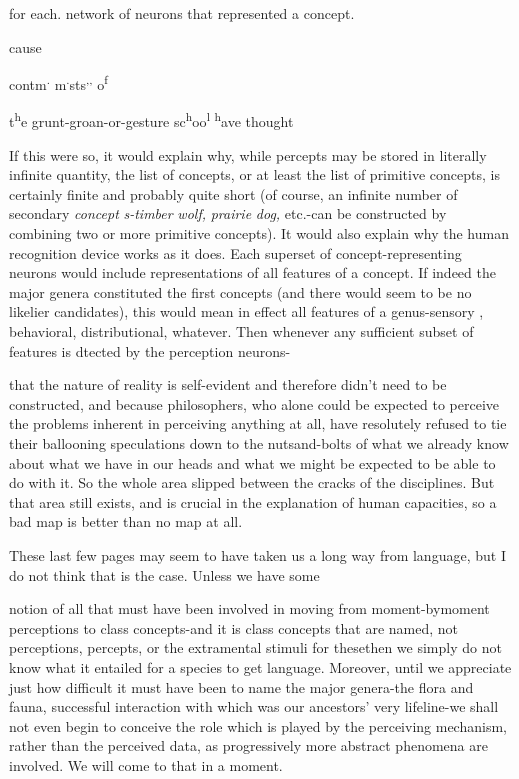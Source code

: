 for each. network of neurons that represented a concept.

cause

\textsuperscript{{\textquotedbl}}contm\textsuperscript{.} m\textsuperscript{.}sts\textsuperscript{,,} o\textsuperscript{f}

t\textsuperscript{h}e grunt-groan-or-gesture sc\textsuperscript{h}oo\textsuperscript{l} \textsuperscript{h}ave thought

If this were so, it would explain why, while percepts may be stored in literally infinite quantity, the list of concepts, or at least the list of primitive concepts, is certainly finite and probably quite short (of course, an infinite number of secondary \textit{concept} \textit{s-timber} \textit{wolf,} \textit{prairie} \textit{dog,} etc.-can be constructed by combining two or more primitive concepts). It would also explain why the human recognition device works as it does. Each superset of concept-representing neurons would include representations of all features of a concept. If indeed the major genera constituted the first concepts (and there would seem to be no likelier candidates), this would mean in effect all features of a genus-sensory , behavioral, distributional, whatever. Then whenever any sufficient subset of features is dtected by the perception neurons-

that the nature of reality is self-evident and therefore didn't need to be constructed, and because philosophers, who alone could be expected to perceive the problems inherent in perceiving anything at all, have resolutely refused to tie their ballooning speculations down to the nuts\-and-bolts of what we already know about what we have in our heads and what we might be expected to be able to do with it. So the whole area slipped between the cracks of the disciplines. But that area still exists, and is crucial in the explanation of human capacities, so a bad map is better than no map at all.

These last few pages may seem to have taken us a long way from language, but I do not think that is the case. Unless we have some

  


 


notion of all that must have been involved in moving from moment-by\-moment perceptions to class concepts-and it is class concepts that are named, not perceptions, percepts, or the extramental stimuli for these\-then we simply do not know what it entailed for a species to get language. Moreover, until we appreciate just how difficult it must have been to name the major genera-the flora and fauna, successful inter\-action with which was our ancestors' very lifeline-we shall not even begin to conceive the role which is played by the perceiving mechan\-ism, rather than the perceived data, as progressively more abstract phenomena are involved. We will come to that in a moment.

